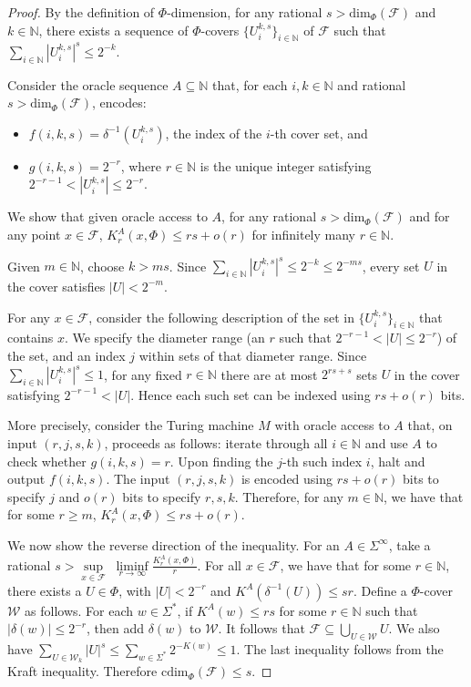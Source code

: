 \documentclass[10pt,a4paper]{amsart}
\newcommand{\F}{{\mathcal{F}}}
\newcommand{\N}{\mathbb{N}}
\newcommand{\U}{U}
\newcommand{\UU}{{\mathcal{W}}}
\newcommand{\cdim}{\mathrm{cdim}}
\renewcommand{\dim}{{\mathrm{dim}}}
\newcommand{\x}{x}
\begin{document}
\begin{proof}
	
	By the definition of $\Phi$-dimension, for any rational $s > \dim_\Phi(\mathcal{F})$ and $k \in \mathbb{N}$, there exists a sequence of $\Phi$-covers $\{\U_i^{k,s}\}_{i \in \mathbb{N}}$ of $\mathcal{F}$ such that
	\(
	\sum_{i \in \mathbb{N}} |\U_i^{k,s}|^s \leq 2^{-k}.
	\)
	
	 Consider the oracle sequence $A \subseteq \mathbb{N}$ that, for each $i, k \in \mathbb{N}$ and rational $s > \dim_\Phi(\mathcal{F})$, encodes:
	\begin{itemize}
		\item $f(i,k,s) = \delta^{-1}(\U_i^{k,s})$, the index of the $i$-th cover set, and
		\item $g(i,k,s) = 2^{-r}$, where $r \in \mathbb{N}$ is the unique integer satisfying $2^{-r-1} < |\U_i^{k,s}| \leq 2^{-r}$.
	\end{itemize}

	We show that given oracle access to $A$, for any rational $s > \dim_\Phi(\mathcal{F})$ and	for any point $x \in \F$, ${K_r^A(\x, \Phi)} \leq rs + o(r)$ for infinitely many $r \in \N$.
	
	Given $m \in \mathbb{N}$, choose $k > ms$. Since $\sum_{i \in \mathbb{N}} |\U_i^{k,s}|^s \leq 2^{-k} \leq 2^{-ms}$, every set $U$ in the cover satisfies $|U| < 2^{-m}$.
		
	
	For any $x \in \F$, consider the following description of the set in $\{\U_i^{k,s}\}_{i \in \mathbb{N}}$ that contains $x$. We specify the diameter range (an $r$ such that $2^{-r-1} < |U| \leq 2^{-r}$) of the set, and an index $j$ within sets of that diameter range. 
	Since $\sum_{i \in \mathbb{N}} |\U_i^{k,s}|^s \leq 1$, for any fixed $r \in \mathbb{N}$ there are at most $2^{rs + s} $ sets $U$ in the cover satisfying $2^{-r-1} < |U|$. Hence each such set can be indexed using $rs + o(r)$ bits. 
	
	More precisely, consider the Turing machine $M$ with oracle access to $A$ that, on input $(r, j, s, k)$, proceeds as follows: iterate through all $i \in \mathbb{N}$ and use $A$ to check whether $g(i,k,s) = r$. Upon finding the $j$-th such index $i$, halt and output $f(i,k,s)$.
	The input $(r, j, s, k)$ is encoded using $rs + o(r)$ bits to specify $j$ and $o(r)$ bits to specify $r,s,k$. Therefore, for any $m \in \N$, we have that for some $r \geq m$, $K_r^A(x, \Phi) \leq rs + o(r)$.
	
	\medskip
	
	We now show the reverse direction of the inequality.
	For an $A \in \Sigma^\infty$, take a rational $s > \sup\limits_{\x \in \mathcal{F}} \; \liminf\limits_{r \rightarrow \infty} \frac{K_r^A(\x, \Phi)}{r}$. For all $x \in \F$, we have that for some $r \in \N$, there exists a $U \in \Phi$, with $|U| < 2^{-r}$ and $K^A(\delta^{-1}(U)) \leq sr$. Define a $\Phi$-cover $\UU$ as follows. For each $w \in \Sigma^*$, if $K^A(w) \leq rs$ for some $r \in \N$ such that $ |\delta(w)| \leq 2^{-r}$, then add $\delta(w)$ to $\UU$.
	It follows that $\F \subseteq \bigcup_{U \in \UU} U $.
	We also have $\sum_{U \in \UU_k} |U|^s \leq \sum_{w \in \Sigma^*} 2^{-K(w)} \leq 1$. The last inequality follows from the Kraft inequality. Therefore $\cdim_{\Phi}(\F) \leq s$.
\end{proof}
\end{document}
